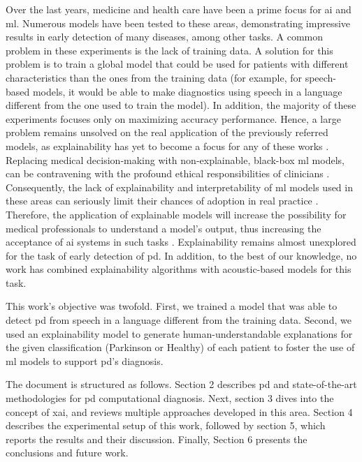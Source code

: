 Over the last years, medicine and health care have been a prime focus for \gls{ai} and \gls{ml}. Numerous models have been tested to these areas, demonstrating impressive results in early detection of many diseases, among other tasks. A common problem in these experiments is the lack of training data. A solution for this problem is to train a global model that could be used for patients with different characteristics than the ones from the training data (for example, for speech-based models, it would be able to make diagnostics using speech in a language different from the one used to train the model). In addition, the majority of these experiments focuses only on maximizing accuracy performance. Hence, a large problem remains unsolved on the real application of the previously referred models, as explainability has yet to become a focus for any of these works \cite{LIME_explainability}.
Replacing medical decision‐making with non-explainable, black-box \gls{ml} models, can be contravening with the profound ethical responsibilities of clinicians \cite{black_box_model_problem}. Consequently, the lack of explainability and interpretability of \gls{ml} models used in these areas can seriously limit their chances of adoption in real practice \cite{interpretability_importance}. Therefore, the application of explainable models will increase the possibility for medical professionals to understand a model's output, thus increasing the acceptance of \gls{ai} systems in such tasks \cite{explainable_ai_systems}. Explainability remains almost unexplored for the task of early detection of \gls{pd}. In addition, to the best of our knowledge, no work has combined explainability algorithms with acoustic-based models for this task.

This work's objective was twofold. First, we trained a model that was able to detect \gls{pd} from speech in a language different from the training data. Second, we used an explainability model to generate human-understandable explanations for the given classification (Parkinson or Healthy) of each patient to foster the use of \gls{ml} models to support \gls{pd}'s diagnosis.

The document is structured as follows. Section 2 describes \gls{pd} and state-of-the-art methodologies for \gls{pd} computational diagnosis. Next, section 3 dives into the concept of \gls{xai}, and reviews multiple approaches developed in this area. Section 4 describes the experimental setup of this work, followed by section 5, which reports the results and their discussion. Finally, Section 6 presents the conclusions and future work.


